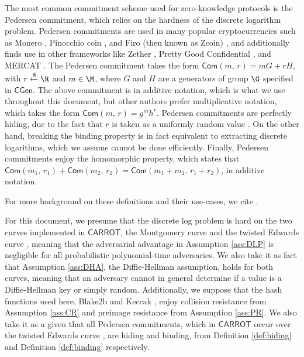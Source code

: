 \documentclass{article}
\theoremstyle{definition}
\newcommand{\6}{\mathbf}
\newcommand{\7}{\mathcal}
\renewcommand{\sf}[1]{{\mathsf{#1}}}
\newcommand{\carr}{$\sf{CARROT}$ }
\begin{document}
The most common commitment scheme used for zero-knowledge protocols is the Pedersen commitment, which relies on the hardness of the discrete logarithm problem. 
Pedersen commitments are used in many popular cryptocurrencies such as Monero \cite{MLSAG}, Pinocchio coin \cite{PinocchioCoin}, and Firo (then known as Zcoin) \cite{ZcoinWhitepaper},
and additionally finds use in other frameworks like Zether \cite{Zether}, Pretty Good Confidential \cite{PGC}, and MERCAT \cite{MERCAT}. 
The Pedersen commitment takes the form $\mathsf{Com}(m, \, r) = mG + rH$, with $r\xleftarrow{\$} \R$ and $m \in \M$, where $G$ and $H$ are a generators of group $\G$ specified in $\sf{CGen}$.
The above commitment is in additive notation, which is what we use throughout this document, but other authors prefer multiplicative notation, which takes the form $\mathsf{Com}(m, \, r) = g^m h^r$.
Pedersen commitments are perfectly hiding, due to the fact that $r$ is taken as a uniformly random value \cite{Zecrey,QuantumOneWay}. 
On the other hand, breaking the binding property is in fact equivalent to extracting discrete logarithms, which we assume cannot be done efficiently. 
Finally, Pedersen commitments enjoy the homomorphic property, which states that $\mathsf{Com}(m_1, \, r_1) + \mathsf{Com}(m_2, \, r_2) = \mathsf{Com}(m_1+m_2, \, r_1+r_2)$, in additive notation. 
\medskip 

For more background on these definitions and their use-cases, we cite \cite{CoinFlipping,Marvinthesis,ArithCurcuits,Bullet,Bullet+,Bullet++,RingSigs}.

\medskip 

For this document, we presume that the discrete log problem is hard on the two curves implemented in $\sf{CARROT}$, the Montgomery curve \cite{Montgomery} and the twisted Edwards curve \cite{Edwards}, meaning that the adversarial advantage in Assumption \ref{ass:DLP} is negligible for all probabilistic polynomial-time adversaries. 
We also take it as fact that Assumption \ref{ass:DHA}, the Diffie-Hellman assumption, holds for both curves, meaning that an adversary cannot in general determine if a value is a Diffie-Hellman key or simply random.
Additionally, we suppose that the hash functions used here, Blake2b \cite{Blake} and Keccak \cite{Keccak}, enjoy collision resistance from Assumption \ref{ass:CR} and preimage resistance from Assumption \ref{ass:PR}. 
We also take it as a given that all Pedersen commitments, which in \carr occur over the twisted Edwards curve \cite{Edwards}, are hiding and binding, from Definition \ref{def:hiding} and Definition \ref{def:binding} respectively.
\medskip 
\end{document}
